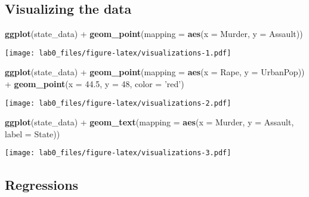 \documentclass[]{article}
\newenvironment{Shaded}{\begin{snugshade}}{\end{snugshade}}
\newcommand{\KeywordTok}[1]{\textcolor[rgb]{0.13,0.29,0.53}{\textbf{{#1}}}}
\newcommand{\DataTypeTok}[1]{\textcolor[rgb]{0.13,0.29,0.53}{{#1}}}
\newcommand{\DecValTok}[1]{\textcolor[rgb]{0.00,0.00,0.81}{{#1}}}
\newcommand{\FloatTok}[1]{\textcolor[rgb]{0.00,0.00,0.81}{{#1}}}
\newcommand{\StringTok}[1]{\textcolor[rgb]{0.31,0.60,0.02}{{#1}}}
\newcommand{\NormalTok}[1]{{#1}}
\begin{document}
\subsection{Visualizing the data}\label{visualizing-the-data}

\begin{Shaded}
\begin{Highlighting}[]
\KeywordTok{ggplot}\NormalTok{(state_data) +}
\StringTok{  }\KeywordTok{geom_point}\NormalTok{(}\DataTypeTok{mapping =} \KeywordTok{aes}\NormalTok{(}\DataTypeTok{x =} \NormalTok{Murder, }\DataTypeTok{y =} \NormalTok{Assault))}
\end{Highlighting}
\end{Shaded}

\texttt{[image: lab0\_files/figure-latex/visualizations-1.pdf]}

\begin{Shaded}
\begin{Highlighting}[]
\KeywordTok{ggplot}\NormalTok{(state_data) +}
\StringTok{  }\KeywordTok{geom_point}\NormalTok{(}\DataTypeTok{mapping =} \KeywordTok{aes}\NormalTok{(}\DataTypeTok{x =} \NormalTok{Rape, }\DataTypeTok{y =} \NormalTok{UrbanPop)) +}
\StringTok{  }\KeywordTok{geom_point}\NormalTok{(}\DataTypeTok{x =} \FloatTok{44.5}\NormalTok{, }\DataTypeTok{y =} \DecValTok{48}\NormalTok{, }\DataTypeTok{color =} \StringTok{'red'}\NormalTok{)}
\end{Highlighting}
\end{Shaded}

\texttt{[image: lab0\_files/figure-latex/visualizations-2.pdf]}

\begin{Shaded}
\begin{Highlighting}[]
\KeywordTok{ggplot}\NormalTok{(state_data) +}
\StringTok{  }\KeywordTok{geom_text}\NormalTok{(}\DataTypeTok{mapping =} \KeywordTok{aes}\NormalTok{(}\DataTypeTok{x =} \NormalTok{Murder, }\DataTypeTok{y =} \NormalTok{Assault, }\DataTypeTok{label =} \NormalTok{State))}
\end{Highlighting}
\end{Shaded}

\texttt{[image: lab0\_files/figure-latex/visualizations-3.pdf]}

\subsection{Regressions}\label{regressions}

\begin{Shaded}
\end{Shaded}
\end{document}
